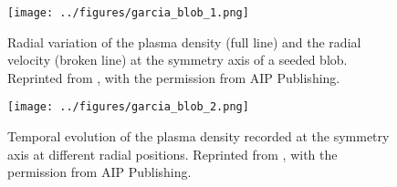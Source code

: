 \begin{figure}
  \centering
  \begin{minipage}{.48\linewidth}
    \texttt{[image: ../figures/garcia\_blob\_1.png]}
    \caption{Radial variation of the plasma density (full line) and the radial velocity (broken line) at the symmetry axis of a seeded blob. Reprinted from \cite{garcia2005mechanism}, with the permission from AIP Publishing.}
    \label{Fig:garcia_1}
  \end{minipage}
  \hfill
  \begin{minipage}{.48\linewidth}
    \texttt{[image: ../figures/garcia\_blob\_2.png]}
    \caption{Temporal evolution of the plasma density recorded at the symmetry axis at different radial positions. Reprinted from \cite {garcia2005mechanism}, with the permission from AIP Publishing.}
    \label{Fig:garcia_2}
  \end{minipage}
\end{figure}

